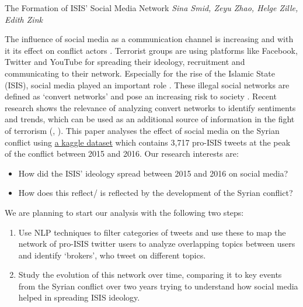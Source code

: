 \documentclass[11pt,a4paper]{article}
\begin{document}
\begin{center}
{\huge{The Formation of ISIS' Social Media Network}}
\bigbreak
\textit{Sina Smid, Zeyu Zhao, Helge Zille, Edith Zink}
\end{center}

The influence of social media as a communication channel is increasing and with it its effect on conflict actors \citep{Zeitzoff_2017}. Terrorist groups are using platforms like Facebook, Twitter and YouTube for spreading their ideology, recruitment and communicating to their network. Especially for the rise of the Islamic State (ISIS), social media played an important role \citep{Ferrara_2017}. These illegal social networks are defined as ‘convert networks’ and pose an increasing risk to society \citep{Freeman_2017}. Recent research shows the relevance of analyzing convert networks to identify sentiments and trends, which can be used as an additional source of information in the fight of terrorism
(\cite{Awan_2017}, \cite{Mitts_2018}).
\bigbreak
This paper analyses the effect of social media on the Syrian conflict using \href{https://www.kaggle.com/fifthtribe/how-isis-uses-twitter}{a kaggle dataset} which contains 3,717 pro-ISIS tweets at the peak of the conflict between 2015 and 2016.
\bigbreak
Our research interests are:
\begin{itemize}
\item How did the ISIS’ ideology spread between 2015 and 2016 on social media?
\item How does this reflect/ is reflected by the development of the Syrian conflict?
\end{itemize} 

We are planning to start our analysis with the following two steps:
\begin{enumerate}
\item Use NLP techniques to filter categories of tweets and use these to map the network of pro-ISIS twitter users to analyze overlapping topics between users and identify ‘brokers’, who tweet on different topics. 
\item Study the evolution of this network over time, comparing it to key events from the Syrian conflict over two years trying to understand how social media helped in spreading ISIS ideology.
\end{enumerate}

\cleardoublepage
{}


\end{document}

